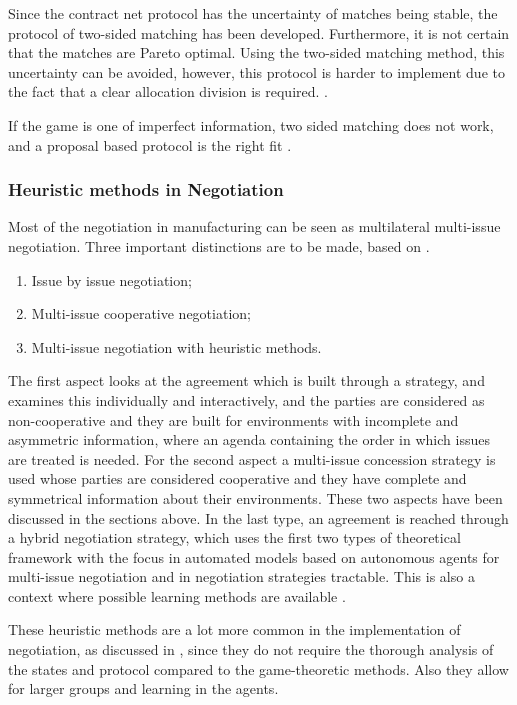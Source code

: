 Since the contract net protocol has the uncertainty of matches being stable, the protocol of two-sided matching has been developed. Furthermore, it is not certain that the matches are Pareto optimal. Using the two-sided matching method, this uncertainty can be avoided, however, this protocol is harder to implement due to the fact that a clear allocation division is required. \citep{fatima2014principles}.
 
If the game is one of imperfect information, two sided matching does not work, and a proposal based protocol is the right fit \citep{rahwan2003argumentation}.


\subsubsection{Heuristic methods in Negotiation}
\label{sec:lit:learn}
Most of the negotiation in manufacturing can be seen as multilateral multi-issue negotiation. Three important distinctions are to be made, based on \citet{lai2004literature}. 
\begin{enumerate}
	\item
	Issue by issue negotiation;
	\item
	Multi-issue cooperative negotiation;
	\item
	Multi-issue negotiation with heuristic methods.
	\end{enumerate}
	
The first aspect looks at the agreement which is built through a strategy, and examines this individually and interactively, and the parties are considered as non-cooperative and they are built for environments with incomplete and asymmetric information, where an agenda containing the order in which issues are treated is needed. For the second aspect a multi-issue concession strategy is used whose parties are considered cooperative and they have complete and symmetrical information about their environments. These two aspects have been discussed in the sections above. In the last type, an agreement is reached through a hybrid negotiation strategy, which uses the first two types of theoretical framework with the focus in automated models based on autonomous agents for multi-issue negotiation and in negotiation strategies tractable. This is also a context where possible learning methods are available \citep{schramm2013bilateral}. 
	
These heuristic methods are a lot more common in the implementation of negotiation, as discussed in \citep{leitao2013past, monostori2006agent}, since they do not require the thorough analysis of the states and protocol compared to the game-theoretic methods. Also they allow for larger groups and learning in the agents.
	
